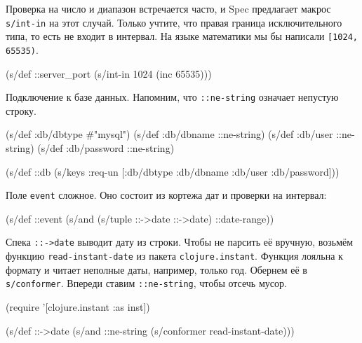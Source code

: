
Проверка на число и диапазон встречается часто, и Spec предлагает макрос
\verb|s/int-in| на этот случай. Только учтите, что правая граница
исключительного типа, то есть не входит в интервал. На языке математики мы бы
написали \verb|[1024, 65535)|.

\begin{english}
  \begin{clojure}
(s/def ::server_port
  (s/int-in 1024 (inc 65535)))
  \end{clojure}
\end{english}


\noindent
Подключение к базе данных. Напомним, что \verb|::ne-string| означает
непустую строку.

\begin{english}
  \begin{clojure}
(s/def :db/dbtype   #{"mysql"})
(s/def :db/dbname   ::ne-string)
(s/def :db/user     ::ne-string)
(s/def :db/password ::ne-string)

(s/def ::db
  (s/keys :req-un [:db/dbtype
                   :db/dbname
                   :db/user
                   :db/password]))
  \end{clojure}
\end{english}

Поле \verb|event| сложное. Оно состоит из кортежа дат и проверки на интервал:

\begin{english}
  \begin{clojure}
(s/def ::event
  (s/and (s/tuple ::->date ::->date)
         ::date-range))
  \end{clojure}
\end{english}


Спека \verb|::->date| выводит дату из строки. Чтобы не парсить её вручную,
возьмём функцию \verb|read-instant-date| из пакета \verb|clojure.instant|.
Функция лояльна к формату и читает неполные даты, например, только год.
Обернем её в \verb|s/conformer|. Впереди ставим \verb|::ne-string|,
чтобы отсечь мусор.


\begin{english}
  \begin{clojure}
(require '[clojure.instant :as inst])

(s/def ::->date
  (s/and ::ne-string (s/conformer read-instant-date)))
  \end{clojure}
\end{english}

